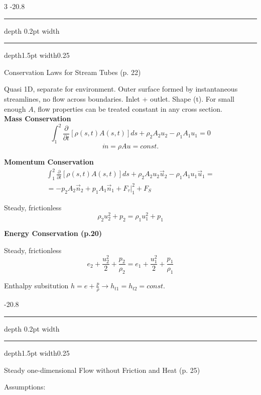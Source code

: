 \documentclass[8pt, landscape, fleqn]{scrartcl}
\makeatletter
\renewcommand{\section}{\@startsection{section}{1}{0mm}%
{-2\baselineskip}{0.8\baselineskip}%
{\hrule depth 0.2pt width\columnwidth\hrule depth1.5pt
width0.25\columnwidth\vspace*{1.2em}\Large\bfseries\rmfamily}}
\makeatother
\begin{document}
\begin{multicols*}{3}
\section{Conservation Laws for Stream Tubes (p. 22)}

Quasi 1D, separate for environment. Outer surface formed by instantaneous streamlines, no flow across boundaries. Inlet + outlet. Shape (t). For small enough $A$, flow properties can be treated constant in any cross section. \\

\textbf{Mass Conservation}
\begin{equation*}
    \int_1^2 \frac{\partial}{\partial t}\left[ \rho(s,t) A(s,t)\right] ds + \rho_2 A_2 u_2 - \rho_1 A_1 u_1 = 0
\end{equation*}
\begin{equation*}
    \dot{m} = \rho A u = const.
\end{equation*}

\textbf{Momentum Conservation}
\begin{align*}
    \int_1^2 \frac{\partial}{\partial t} \left[ \rho(s,t) A(s,t) \right] ds + \rho_2 A_2 u_2 \vec{u}_2 - \rho_1 A_1 u_1 \vec{u}_1 = \\
    = -p_2 A_2 \vec{n}_2 + p_1 A_1 \vec{n}_1 + F_\tau |_1^2 + F_S
\end{align*}

Steady, frictionless
\begin{equation*}
    \rho_2 u_2^2 + p_2 = \rho_1 u_1^2 + p_1
\end{equation*}

\textbf{Energy Conservation (p.20)}

Steady, frictionless
\begin{equation*}
    e_2 + \frac{u_2^2}{2} + \frac{p_2}{\rho_2} = e_1 + \frac{u_1^2}{2} + \frac{p_1}{\rho_1}
\end{equation*}

Enthalpy subsitution $h = e + \frac{p}{\rho} \rightarrow h_{t1} = h_{t2} = const.$

\section{Steady one-dimensional Flow without Friction and Heat (p. 25)}

Assumptions: 


\end{multicols*}
\end{document}
